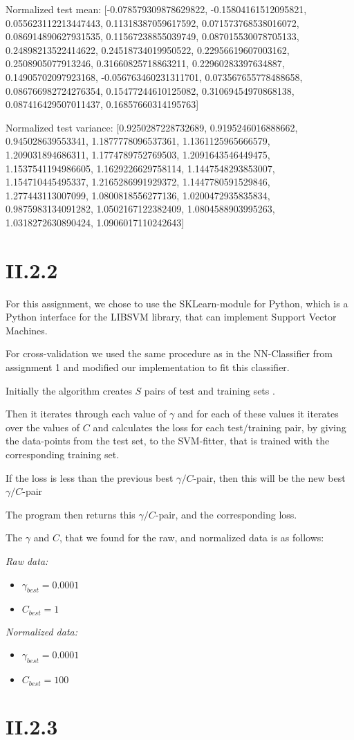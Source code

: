 \documentclass[12pt, a4paper]{article}
\begin{document}
Normalized test mean:
[-0.078579309878629822, -0.15804161512095821, 0.055623112213447443, 0.11318387059617592, 0.071573768538016072, 0.086914890627931535, 0.11567238855039749, 0.087015530078705133, 0.24898213522414622, 0.24518734019950522, 0.22956619607003162, 0.2508905077913246, 0.31660825718863211, 0.22960283397634887, 0.14905702097923168, -0.056763460231311701, 0.073567655778488658, 0.086766982724276354, 0.15477244610125082, 0.31069454970868138, 0.087416429507011437, 0.16857660314195763]

Normalized test variance:
[0.9250287228732689, 0.9195246016888662, 0.945028639553341, 1.1877778096537361, 1.1361125965666579, 1.209031894686311, 1.1774789752769503, 1.2091643546449475, 1.1537541194986605, 1.1629226629758114, 1.1447548293853007, 1.154710445495337, 1.2165286991929372, 1.1447780591529846, 1.277443113007099, 1.0800818556277136, 1.0200472935835834, 0.9875983134091282, 1.0502167122382409, 1.0804588903995263, 1.0318272630890424, 1.0906017110242643]

\section{II.2.2}
For this assignment, we chose to use the SKLearn-module for Python, which is a Python interface for the LIBSVM library, that can implement Support Vector Machines.

For cross-validation we used the same procedure as in the NN-Classifier from assignment 1 and modified our implementation to fit this classifier.

Initially the algorithm creates $S$ pairs of test and training sets .

Then it iterates through each value of $\gamma$ and for each of these values it iterates over the values of $C$ and calculates the loss for each test/training pair, by giving the data-points from the test set, to the SVM-fitter, that is trained with the corresponding training set.

If the loss is less than the previous best $\gamma/C$-pair, then this will be the new best $\gamma/C$-pair

The program then returns this $\gamma/C$-pair, and the corresponding loss.

The $\gamma$ and $C$, that we found for the raw, and normalized data is as follows:

\textit{Raw data:}
\begin{itemize}
	\item $\gamma_{best} = 0.0001$
	\item $C_{best} = 1$
\end{itemize}

\textit{Normalized data:}
\begin{itemize}
	\item $\gamma_{best} = 0.0001$
	\item $C_{best} = 100$
\end{itemize}


\section{II.2.3}
\end{document}

